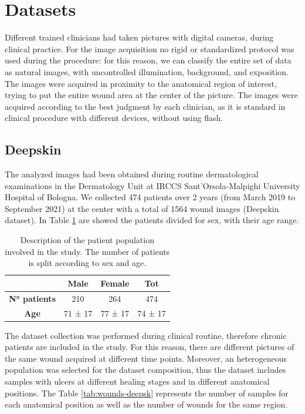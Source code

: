 \documentclass[../main.tex]{subfiles}
\begin{document}
\section{Datasets}
Different trained clinicians had taken pictures with digital cameras, during clinical practice.
For the image acquisition no rigid or standardized protocol was used during the procedure: for this reason, we can classify the entire set of data as natural images, with uncontrolled illumination, background, and exposition.
The images were acquired in proximity to the anatomical region of interest, trying to put the entire wound area at the center of the picture. 
The images were acquired according to the best judgment by each clinician, as it is standard in clinical procedure with different devices, without using flash.
\subsection{Deepskin}
The analyzed images had been obtained during routine dermatological examinations in the Dermatology Unit at IRCCS Sant’Orsola-Malpighi University Hospital of Bologna. 
We collected 474 patients over 2 years (from March 2019 to September 2021) at the center with a total of 1564 wound images (Deepskin dataset).
In Table \ref{tab:patients-deepskin} are showed the patients divided for sex, with their age range.

\begin{table}[!ht]
    \centering
    \begin{tabular}{c|c|c|c|}
    
         & \textbf{Male} & \textbf{Female} & \textbf{Tot} \\ \hline
        \textbf{N° patients} & 210 & 264 & 474 \\ 
        \textbf{Age} & 71 ± 17 & 77 ± 17 & 74 ± 17 \\ \hline
    \end{tabular}
    \caption{Description of the patient population involved in the study. The number of patients is split according to sex and age.}
    \label{tab:patients-deepskin}
\end{table}
The dataset collection was performed during clinical routine, therefore chronic patients are included in the study.
For this reason, there are different pictures of the same wound acquired at different time points. 
Moreover, an heterogeneous population was selected for the dataset composition, thus the dataset includes samples with ulcers at different healing stages and in different anatomical positions.
The Table \ref{tab:wounds-deepsk} represents the number of samples for each anatomical position as well as the number of wounds for the same region.
\end{document}
